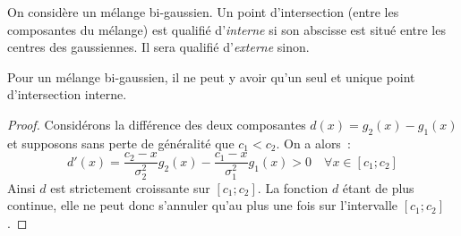 \documentclass[main.tex]{subfiles}
\begin{document}
\begin{dfn} On considère un mélange bi-gaussien. 
Un point d'intersection (entre les composantes du mélange) est qualifié d'\emph{interne} si son abscisse est situé entre les centres des gaussiennes. Il sera qualifié d'\emph{externe} sinon.
\end{dfn}

\begin{thm}\label{thm:anxe_pt_unique}
Pour un mélange bi-gaussien, il ne peut y avoir qu'un seul et unique point d'intersection interne. 
\end{thm}

\begin{proof}
Considérons la différence des deux composantes $d(x)=g_2(x)-g_1(x)$ et supposons sans perte de généralité que $c_1<c_2$. On a alors~:
$$d'(x) = \frac{c_2-x}{\sigma_2^2}g_2(x) - \frac{c_1-x}{\sigma_1^2} g_1(x) >0 \quad \forall x \in [c_1; c_2] $$
Ainsi $d$ est strictement croissante sur $[c_1;c_2]$. La fonction $d$ étant de plus continue, elle ne peut donc s'annuler qu'au plus une fois sur l'intervalle $[c_1;c_2]$.
\end{proof}
\end{document}
